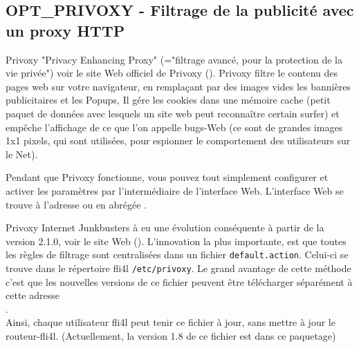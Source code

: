\subsection{OPT\_PRIVOXY - Filtrage de la publicité avec un proxy HTTP}

    Privoxy "Privacy Enhancing Proxy" (="filtrage avancé, pour la protection de
    la vie privée") voir le site Web officiel de Privoxy ().
    Privoxy filtre le contenu des pages web sur votre navigateur, en remplaçant
    par des images vides les bannières publicitaires et les Popups, Il gére les
    cookies dans une mémoire cache (petit paquet de données avec lesquels un site
    web peut reconnaître certain surfer) et empêche l'affichage de ce que l'on
    appelle bugs-Web (ce sont de grandes images 1x1 pixels, qui sont utilisées,
    pour espionner le comportement des utilisateurs sur le Net).

    Pendant que Privoxy fonctionne, vous pouvez tout simplement configurer et
    activer les paramètres par l'intermédiaire de l'interface Web. L'interface
    Web se trouve à l'adresse  ou en abrégée
    .


    Privoxy Internet Junkbusters à eu une évolution conséquente à partir de la
    version 2.1.0, voir le site Web ().
    L'innovation la plus importante, est que toutes les règles de filtrage sont
    centralisées dans un fichier \texttt{default.action}. Celui-ci se trouve dans le
    répertoire fli4l \texttt{/etc/privoxy}. Le grand avantage de cette méthode c'est
    que les nouvelles versions de ce fichier peuvent être télécharger séparément
    à cette adresse \\
    .\\
    Ainsi, chaque utilisateur fli4l peut tenir ce fichier à jour, sans mettre
    à jour le routeur-fli4l. (Actuellement, la version 1.8 de ce fichier est
    dans ce paquetage)

